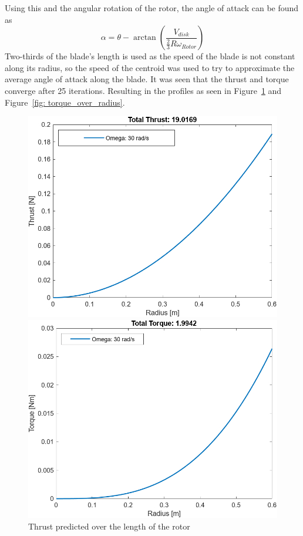        Using this and the angular rotation of the rotor, the angle of attack can be found as \[\alpha = \theta - \arctan\left(\frac{V_{disk}}{\frac{2}{3}R\omega_{Rotor}}\right)\] Two-thirds of the blade's length is used as the speed of the blade is not constant along its radius, so the speed of the centroid was used to try to approximate the average angle of attack along the blade. 
        It was seen that the thrust and torque converge after 25 iterations. Resulting in the profiles as seen in Figure~\ref{fig: thrust_over_radius} and Figure~\ref{fig: torque_over_radius}.


        \begin{figure}[h]
            \centering
            \begin{minipage}{0.45\textwidth}
                \centering
                \includegraphics[width=\textwidth]{figs/Model/Rotor/Thrust_Vs_Radius.png}
                \caption{Thrust predicted over the length of the rotor}
                \label{fig: thrust_over_radius}
            \end{minipage}\hfill
            \begin{minipage}{0.45\textwidth}
                \centering
                \includegraphics[width=\textwidth]{figs/Model/Rotor/Torque_Vs_Radius.png}

\end{minipage}
\end{figure}
